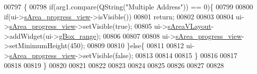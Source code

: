 \begin{DoxyCode}
00797 \{
00798     \textcolor{keywordflow}{if}(arg1.compare(QString(\textcolor{stringliteral}{"Multiple Address"})) == 0)\{
00799 
00800         \textcolor{keywordflow}{if}(ui->\hyperlink{a00080_ae4fe44aa026dd0e84e0f10cdcabca504}{sArea\_progress\_view}->isVisible())
00801               \textcolor{keywordflow}{return};
00802 
00803 
00804         ui->\hyperlink{a00080_ae4fe44aa026dd0e84e0f10cdcabca504}{sArea\_progress\_view}->setVisible(\textcolor{keyword}{true});
00805         ui->\hyperlink{a00080_a2bdce9ad313cd4ee575613f36cbc4678}{sAreaVLayout}->addWidget(ui->\hyperlink{a00080_a3c12d0504a310784c3820d1a9ad469c2}{gBox\_range});
00806 
00807 
00808         ui->\hyperlink{a00080_ae4fe44aa026dd0e84e0f10cdcabca504}{sArea\_progress\_view}->setMinimumHeight(450);
00809 
00810        \}\textcolor{keywordflow}{else}\{
00811 
00812         ui->\hyperlink{a00080_ae4fe44aa026dd0e84e0f10cdcabca504}{sArea\_progress\_view}->setVisible(\textcolor{keyword}{false});
00813 
00814 
00815        \}
00816 
00817 
00818 
00819 \}
00820 
00821 
00822 
00823 
00824 
00825 
00826 
00827 
00828 
\end{DoxyCode}
